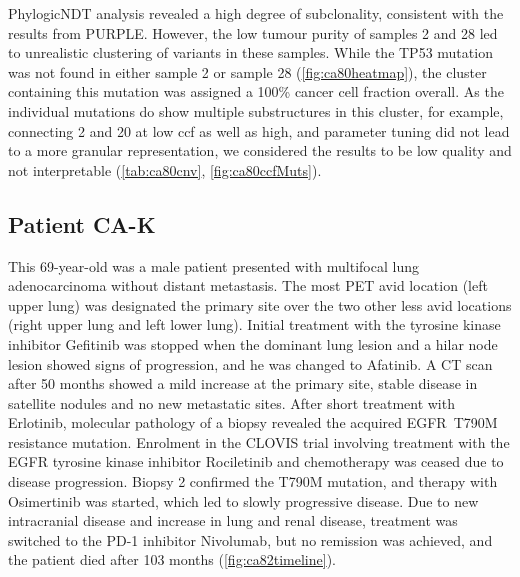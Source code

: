 PhylogicNDT analysis revealed a high degree of subclonality, consistent with the results from PURPLE. However, the low tumour purity of samples 2 and 28 led to  unrealistic clustering of variants in these samples. While the TP53 mutation was not found in either sample 2 or sample 28 (\autoref{fig:ca80heatmap}), the cluster containing this mutation was assigned a 100\% cancer cell fraction overall. As the individual mutations do show multiple substructures in this cluster, for example, connecting 2 and 20 at low ccf as well as high, and parameter tuning did not lead to a more granular representation, we considered the results to be low quality and not interpretable (\autoref{tab:ca80cnv}, \autoref{fig:ca80ccfMuts}).


\cleardoublepage



\subsection{Patient CA-K}
\label{cascade-sec:CA82}

This 69-year-old was a male patient  presented with multifocal lung adenocarcinoma without distant metastasis. The most PET avid location (left upper lung) was designated the primary site over the two other less avid locations (right upper lung and left lower lung). Initial treatment with the tyrosine kinase inhibitor Gefitinib was stopped when the dominant lung lesion and a hilar node lesion showed signs of progression, and he was changed to Afatinib. A CT scan after 50 months showed a mild increase at the primary site, stable disease in satellite nodules and no new metastatic sites. After short treatment with Erlotinib, molecular pathology of a biopsy revealed the acquired EGFR~T790M resistance mutation. Enrolment in the CLOVIS trial involving treatment with the EGFR tyrosine kinase inhibitor Rociletinib and chemotherapy was ceased due to disease progression. Biopsy 2 confirmed the T790M mutation, and therapy with Osimertinib was started, which led to slowly progressive disease. Due to new intracranial disease and  increase in lung and renal disease, treatment was switched to the PD-1 inhibitor Nivolumab, but no remission was achieved, and the patient died after 103 months (\autoref{fig:ca82timeline}).



